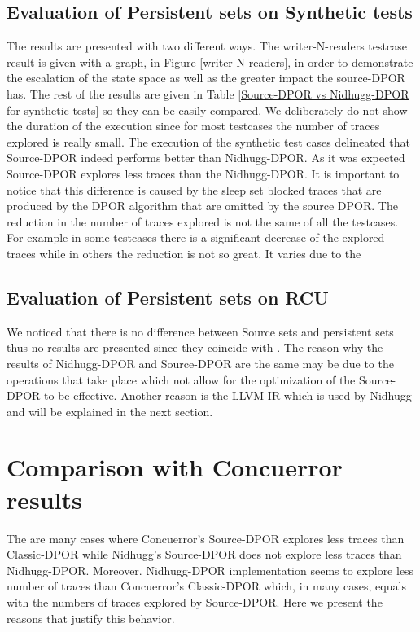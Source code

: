 \subsection{Evaluation of Persistent sets on Synthetic tests}
The results are presented with two different ways. The writer-N-readers testcase result is given with a graph, in Figure
\ref{writer-N-readers}, in order to demonstrate the escalation of the state space as well as the greater impact the
source-DPOR has. The rest of the results are given in Table \ref{Source-DPOR vs Nidhugg-DPOR for synthetic tests} so they can be
easily compared. We deliberately do not show the duration of the execution since for most testcases the number of traces
explored is really small. The execution of the synthetic test cases delineated that Source-DPOR indeed performs better
than Nidhugg-DPOR. As it was expected Source-DPOR explores less traces than the Nidhugg-DPOR. It is important to notice
that this difference is caused by the sleep set blocked traces that are produced by the DPOR algorithm that are omitted
by the source DPOR. The reduction in the number of traces explored is not the same of all the testcases. For example in
some testcases there is a significant decrease of the explored traces while in others the reduction is not so great. It
varies due to the



\subsection{Evaluation of Persistent sets on RCU}
We noticed that there is no difference between Source sets and persistent sets thus no results are presented since they
coincide with \cite{Spin}. The reason why the results of Nidhugg-DPOR and Source-DPOR are the same may be due to the operations
that take place which not allow for the optimization of the Source-DPOR to be effective. Another reason is the LLVM IR
which is used by Nidhugg and will be explained in the next section.

\section{Comparison with Concuerror results}
The are many cases where Concuerror's Source-DPOR explores less traces than Classic-DPOR while Nidhugg's Source-DPOR
does not explore less traces than Nidhugg-DPOR. Moreover. Nidhugg-DPOR implementation seems to explore less number of
traces than Concuerror's Classic-DPOR \cite{AbdullaAronisJohnssonSagonasDPOR2014} which, in many cases, equals with the
numbers of traces explored by Source-DPOR. Here we present the reasons that justify this behavior. 


